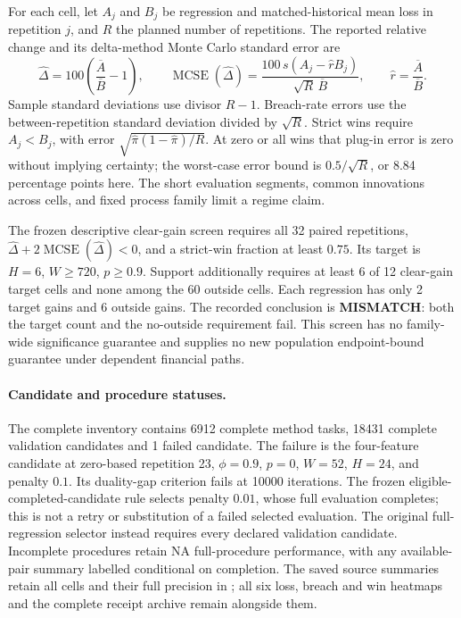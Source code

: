 \documentclass[11pt,a4paper]{article}
\begin{document}
For each cell, let \(A_j\) and \(B_j\) be regression and matched-historical mean
loss in repetition \(j\), and \(R\) the planned number of repetitions. The
reported relative change and its delta-method Monte Carlo standard error are
\[
\widehat\Delta=100\left(\dfrac{\overline A}{\overline B}-1\right),\qquad
\operatorname{MCSE}(\widehat\Delta)=
\dfrac{100\,s(A_j-\widehat rB_j)}{\sqrt R\,\overline B},\qquad
\widehat r=\dfrac{\overline A}{\overline B}.
\]
Sample standard deviations use divisor \(R-1\). Breach-rate errors use the
between-repetition standard deviation divided by
\(\sqrt R\). Strict wins require \(A_j<B_j\), with error
\(\sqrt{\widehat\pi(1-\widehat\pi)/R}\). At zero or all wins that plug-in error is
zero without implying certainty; the worst-case error bound is
\(0.5/\sqrt R\), or 8.84 percentage points here. The short evaluation segments,
common innovations across cells, and fixed process family limit a regime claim.

The frozen descriptive clear-gain screen requires all 32 paired repetitions,
\(\widehat\Delta+2\operatorname{MCSE}(\widehat\Delta)<0\), and a strict-win
fraction at least \(0.75\). Its target is \(H=6\), \(W\ge 720\),
\(p\ge 0.9\). Support additionally requires at least 6 of 12
clear-gain target cells and none among the 60 outside cells. Each regression
has only 2 target gains and 6 outside gains. The recorded conclusion
is \textbf{MISMATCH}: both the target count and the no-outside requirement fail.
This screen has no family-wide significance guarantee and supplies no new
population endpoint-bound guarantee under dependent financial paths.




\paragraph{Candidate and procedure statuses.}
The complete inventory contains 6912 complete method tasks, 18431 complete
validation candidates and 1 failed candidate. The failure is the four-feature
candidate at zero-based repetition 23, \(\phi=0.9\), \(p=0\), \(W=52\),
\(H=24\), and penalty \(0.1\). Its duality-gap criterion fails at 10000
iterations. The frozen eligible-completed-candidate rule selects penalty
\(0.01\), whose full evaluation completes; this is not a retry or substitution
of a failed selected evaluation. The original full-regression selector instead
requires every declared validation candidate. Incomplete procedures retain NA
full-procedure performance, with any available-pair summary labelled conditional
on completion. The saved source summaries retain all cells and their full
precision in ; all six loss, breach and
win heatmaps and the complete receipt archive remain alongside them.
\end{document}
